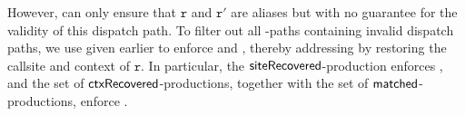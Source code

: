  However, \LFC can only ensure that $\mathtt{r}$ and $\mathtt{r}'$ are aliases but with no guarantee for the validity of
 this dispatch path.
To filter out all  \LFC-paths containing invalid dispatch paths, we use  \LR 
given earlier
to enforce
\dispatchconOne and \dispatchconTwo, thereby addressing 
 by
restoring  the callsite and context of $\mathtt{r}$. In particular,
 the $\textsf{siteRecovered}$-production  enforces
\dispatchconOne, and the set of $\textsf{ctxRecovered}$-productions, together with the set of $\textsf{matched}$-productions, enforce \dispatchconTwo.
%




